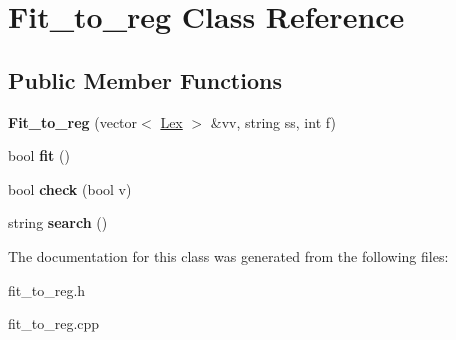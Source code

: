 \hypertarget{class_fit__to__reg}{}\section{Fit\+\_\+to\+\_\+reg Class Reference}
\label{class_fit__to__reg}
\subsection*{Public Member Functions}
\begin{DoxyCompactItemize}
\item 
{\bfseries Fit\+\_\+to\+\_\+reg} (vector$<$ \hyperlink{class_lex}{Lex} $>$ \&vv, string ss, int f)\hypertarget{class_fit__to__reg_a9ac7026078e5ed0fda7b13e0786144e2}{}\label{class_fit__to__reg_a9ac7026078e5ed0fda7b13e0786144e2}

\item 
bool {\bfseries fit} ()\hypertarget{class_fit__to__reg_a082d86f3f01d63dd39719ff3fd4536f1}{}\label{class_fit__to__reg_a082d86f3f01d63dd39719ff3fd4536f1}

\item 
bool {\bfseries check} (bool v)\hypertarget{class_fit__to__reg_aa94137d31536ea572e603206b3787498}{}\label{class_fit__to__reg_aa94137d31536ea572e603206b3787498}

\item 
string {\bfseries search} ()\hypertarget{class_fit__to__reg_a11c14797ab14353f4e0180e9af9b7078}{}\label{class_fit__to__reg_a11c14797ab14353f4e0180e9af9b7078}

\end{DoxyCompactItemize}


The documentation for this class was generated from the following files\+:\begin{DoxyCompactItemize}
\item 
fit\+\_\+to\+\_\+reg.\+h\item 
fit\+\_\+to\+\_\+reg.\+cpp\end{DoxyCompactItemize}
